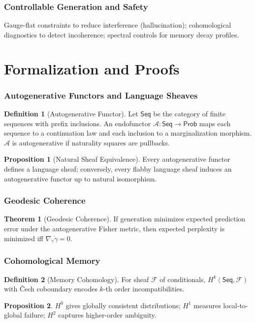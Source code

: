 \documentclass[12pt,a4paper]{article}
\theoremstyle{definition}
\newtheorem{definition}{Definition}[section]
\newtheorem{proposition}{Proposition}[section]
\newtheorem{theorem}{Theorem}[section]
\begin{document}
\section{Controllable Generation and Safety}
Gauge-flat constraints to reduce interference (hallucination); cohomological diagnostics to detect incoherence; spectral controls for memory decay profiles.

\part{Formalization and Proofs}

\section{Autogenerative Functors and Language Sheaves}
\begin{definition}[Autogenerative Functor]
Let $\mathsf{Seq}$ be the category of finite sequences with prefix inclusions. An endofunctor $\mathcal{A}:\mathsf{Seq}\to\mathsf{Prob}$ maps each sequence to a continuation law and each inclusion to a marginalization morphism. $\mathcal{A}$ is autogenerative if naturality squares are pullbacks.
\end{definition}
\begin{proposition}[Natural Sheaf Equivalence]
Every autogenerative functor defines a language sheaf; conversely, every flabby language sheaf induces an autogenerative functor up to natural isomorphism.
\end{proposition}

\section{Geodesic Coherence}
\begin{theorem}[Geodesic Coherence]
If generation minimizes expected prediction error under the autogenerative Fisher metric, then expected perplexity is minimized iff $\nabla_{\dot\gamma}\dot\gamma=0$.
\end{theorem}

\section{Cohomological Memory}
\begin{definition}[Memory Cohomology]
For sheaf $\mathcal{F}$ of conditionals, $H^k(\mathsf{Seq},\mathcal{F})$ with Čech coboundary encodes $k$-th order incompatibilities.
\end{definition}
\begin{proposition}
$H^0$ gives globally consistent distributions; $H^1$ measures local-to-global failure; $H^2$ captures higher-order ambiguity.
\end{proposition}
\end{document}
